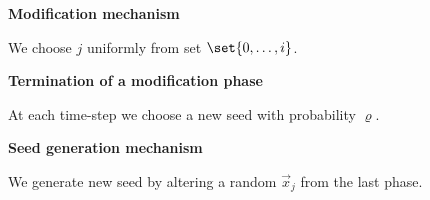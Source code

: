 \documentclass[landscape,footrule]{foils}
\begin{document}
\textbf{Modification mechanism}
\begin{triangles}
\item We choose $j$ uniformly from set $\set{0, \ldots, i}$.\vspace*{2ex} 
\end{triangles}

\textbf{Termination of a modification phase}
\begin{triangles}
\item At each time-step we choose a new seed with probability $\varrho$.\vspace*{2ex} 
\end{triangles}

\textbf{Seed generation mechanism}
\begin{triangles}
\item We generate new seed by altering a random $\vec{x}_j$ from the last phase.\vspace*{1ex} 
\end{triangles}


\end{document}
